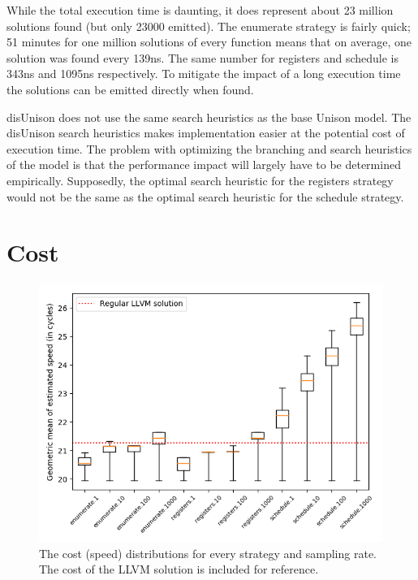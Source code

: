 While the total execution time is daunting, it does represent about 23 million solutions
found (but only 23000 emitted). The enumerate strategy is fairly quick; 51 minutes for one
million solutions of every function means that on average, one solution was found every
139ns. The same number for registers and schedule is 343ns and 1095ns respectively. To
mitigate the impact of a long execution time the solutions can be emitted directly when
found.

disUnison does not use the same search heuristics as the base Unison model. The disUnison
search heuristics makes implementation easier at the potential cost of execution time. The
problem with optimizing the branching and search heuristics of the model is that the
performance impact will largely have to be determined empirically. Supposedly, the optimal
search heuristic for the registers strategy would not be the same as the optimal search
heuristic for the schedule strategy.

\section{Cost}
\label{sec:cost_result}

\begin{figure}[h]
	\centering
	\includegraphics[width=\textwidth,height=0.5\textheight]{results/figures/cost_speed}
	\caption{The cost (speed) distributions for every strategy and sampling rate. The cost of the LLVM solution is included for reference.}
	\label{fig:cost-speed}
\end{figure}

